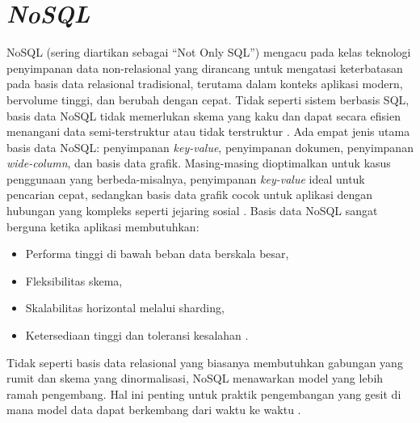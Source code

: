 \section{\textit{NoSQL}}
NoSQL (sering diartikan sebagai ``Not Only SQL'') mengacu pada kelas teknologi penyimpanan data non-relasional yang dirancang untuk mengatasi keterbatasan pada basis data relasional tradisional, terutama dalam konteks aplikasi modern, bervolume tinggi, dan berubah dengan cepat. Tidak seperti sistem berbasis SQL, basis data NoSQL tidak memerlukan skema yang kaku dan dapat secara efisien menangani data semi-terstruktur atau tidak terstruktur \citep[hal.~3]{suehring2021redis}.
\singlespacing{}
Ada empat jenis utama basis data NoSQL{:} penyimpanan \emph{key-value}, penyimpanan dokumen, penyimpanan \emph{wide-column}, dan basis data grafik. Masing-masing dioptimalkan untuk kasus penggunaan yang berbeda-misalnya, penyimpanan \emph{key-value} ideal untuk pencarian cepat, sedangkan basis data grafik cocok untuk aplikasi dengan hubungan yang kompleks seperti jejaring sosial \citep[hal.~4-5]{suehring2021redis}.
Basis data NoSQL sangat berguna ketika aplikasi membutuhkan:
\begin{itemize}
  \item Performa tinggi di bawah beban data berskala besar,
  \item Fleksibilitas skema,
  \item Skalabilitas horizontal melalui sharding,
  \item Ketersediaan tinggi dan toleransi kesalahan \citep[hal.~6-7]{suehring2021redis}.
\end{itemize}


Tidak seperti basis data relasional yang biasanya membutuhkan gabungan yang rumit dan skema yang dinormalisasi, NoSQL menawarkan model yang lebih ramah pengembang. Hal ini penting untuk praktik pengembangan yang gesit di mana model data dapat berkembang dari waktu ke waktu \citep[hal.~6]{suehring2021redis}.

